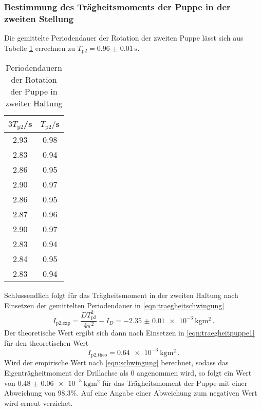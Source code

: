 \subsubsection{Bestimmung des Trägheitsmoments der Puppe in der zweiten Stellung}
Die gemittelte Periodendauer der Rotation der zweiten Puppe lässt sich aus Tabelle
\ref{tab:puppe2} errechnen zu $T_{\text{p2}}=\SI{0.96(001)}{\second}$.
\begin{table}[H]
\centering
\caption{Periodendauern der Rotation der Puppe in zweiter Haltung}
\label{tab:puppe2}
\begin{tabular}{c c}
\toprule
$3T_{\text{p2}}$/s & $T_{\text{p2}}/$s \\
\midrule
2.93 & 0.98 \\
2.83 & 0.94 \\
2.86 & 0.95 \\
2.90 & 0.97 \\
2.86 & 0.95 \\
2.87 & 0.96 \\
2.90 & 0.97 \\
2.83 & 0.94 \\
2.84 & 0.95 \\
2.83 & 0.94 \\
\bottomrule
\end{tabular}
\end{table}
Schlussendlich folgt für das Trägheitsmoment in der zweiten Haltung nach Einsetzen
der gemittelten Periodendauer in \eqref{eqn:traegheitschwingung}
\begin{equation}
  I_{\text{p2,exp}} = \frac{DT_{\text{p2}}^2}{4\pi^2}-I_D = \SI{-2.35(001)e-3}{\kilogram\meter\squared}\,.
\end{equation}
Der theoretische Wert ergibt sich dann nach Einsetzen in
\eqref{eqn:traegheitpuppe1} für den theoretischen Wert
\begin{equation}
  I_{\text{p2,theo}} = \SI{0.64e-3}{\kilogram\meter\squared}\,.
\end{equation}
Wird der empirische Wert nach \eqref{eqn:schwingung} berechnet, sodass das
Eigenträgheitmoment der Drillachse als 0 angenommen wird, so folgt ein Wert
von $\SI{0.48(006)e-3}{\kilogram\meter\squared}$ für das Trägheitsmoment der
Puppe mit einer Abweichung von 98,3\%.
Auf eine Angabe einer Abweichung zum negativen Wert wird erneut verzichet.
